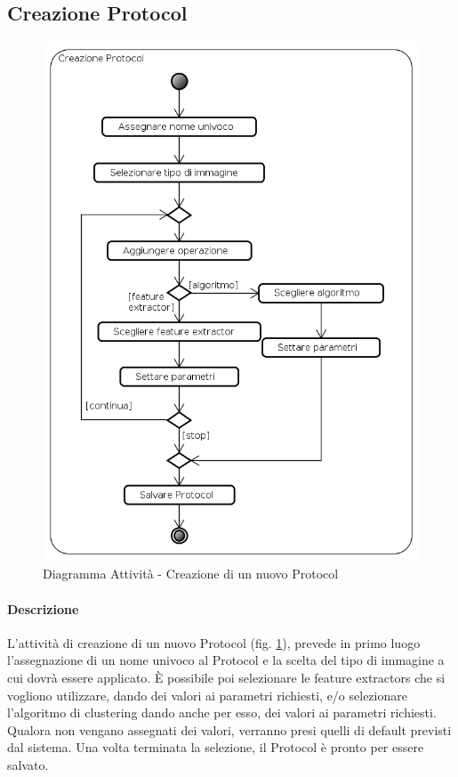 \subsection{Creazione Protocol}
\label{newPr}
\begin{figure}[!h]
	\centering
	\includegraphics[scale=0.6]{./img/Diagrammi_Attivita/Creazione_Protocol}
	\caption{Diagramma Attività - Creazione di un nuovo Protocol}
	\label{newProtocol}
\end{figure}
\paragraph{Descrizione\\}
L'attività di creazione di un nuovo Protocol\glossario{} (fig. \ref{newProtocol}), prevede in primo luogo l'assegnazione di un nome univoco al Protocol\glossario{} e la scelta del tipo di immagine a cui dovrà essere applicato. \`E possibile poi selezionare le feature extractors\glossario{} che si vogliono utilizzare, dando dei valori ai parametri richiesti, e/o selezionare l'algoritmo di clustering\glossario{} dando anche per esso, dei valori ai parametri richiesti. Qualora non vengano assegnati dei valori, verranno presi quelli di default previsti dal sistema. Una volta terminata la selezione, il Protocol\glossario{} è pronto per essere salvato.
\pagebreak

